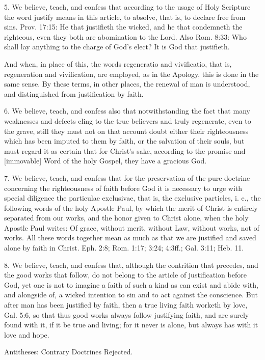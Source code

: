 5. We believe, teach, and confess that according to the usage of Holy Scripture the word justify means in this article, to absolve, that is, to declare free from sins. Prov. 17:15: He that justifieth the wicked, and he that condemneth the righteous, even they both are abomination to the Lord. Also Rom. 8:33: Who shall lay anything to the charge of God's elect? It is God that justifieth.

And when, in place of this, the words regeneratio and vivificatio, that is, regeneration and vivification, are employed, as in the Apology, this is done in the same sense. By these terms, in other places, the renewal of man is understood, and distinguished from justification by faith.

6. We believe, teach, and confess also that notwithstanding the fact that many weaknesses and defects cling to the true believers and truly regenerate, even to the grave, still they must not on that account doubt either their righteousness which has been imputed to them by faith, or the salvation of their souls, but must regard it as certain that for Christ's sake, according to the promise and [immovable] Word of the holy Gospel, they have a gracious God.

7. We believe, teach, and confess that for the preservation of the pure doctrine concerning the righteousness of faith before God it is necessary to urge with special diligence the particulae exclusivae, that is, the exclusive particles, i. e., the following words of the holy Apostle Paul, by which the merit of Christ is entirely separated from our works, and the honor given to Christ alone, when the holy Apostle Paul writes: Of grace, without merit, without Law, without works, not of works. All these words together mean as much as that we are justified and saved alone by faith in Christ. Eph. 2:8; Rom. 1:17; 3:24; 4:3ff.; Gal. 3:11; Heb. 11.

8. We believe, teach, and confess that, although the contrition that precedes, and the good works that follow, do not belong to the article of justification before God, yet one is not to imagine a faith of such a kind as can exist and abide with, and alongside of, a wicked intention to sin and to act against the conscience. But after man has been justified by faith, then a true living faith worketh by love, Gal. 5:6, so that thus good works always follow justifying faith, and are surely found with it, if it be true and living; for it never is alone, but always has with it love and hope.

Antitheses: Contrary Doctrines Rejected.

